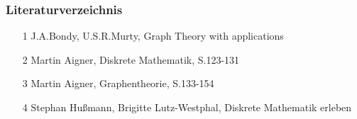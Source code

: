 \begin{frame}
\frametitle{Literaturverzeichnis}
\begin{itemize}
	\item 	[1] J.A.Bondy, U.S.R.Murty, Graph Theory with applications
	\item 	[2] Martin Aigner, Diskrete Mathematik, S.123-131
	\item 	[3] Martin Aigner, Graphentheorie, S.133-154
	\item 	[4] Stephan Hußmann, Brigitte Lutz-Westphal, Diskrete Mathematik erleben

\end{itemize}

\end{frame}